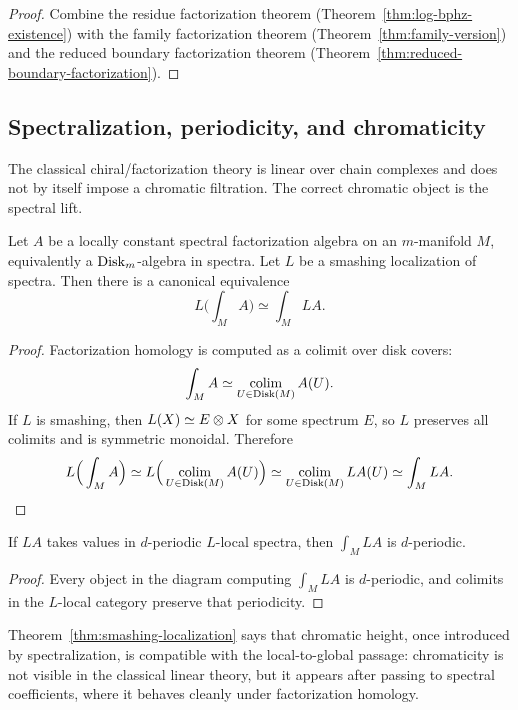 \begin{proof}
Combine the residue factorization theorem (Theorem~\ref{thm:log-bphz-existence}) with the family factorization theorem (Theorem~\ref{thm:family-version}) and the reduced boundary factorization theorem (Theorem~\ref{thm:reduced-boundary-factorization}).
\end{proof}

\subsection{Spectralization, periodicity, and chromaticity}
The classical chiral/factorization theory is linear over chain complexes and does not by itself impose a chromatic filtration. The correct chromatic object is the spectral lift.

\begin{theorem}%
Let $A$ be a locally constant spectral factorization algebra on an $m$-manifold $M$, equivalently a $\mathrm{Disk}_m$-algebra in spectra. Let $L$ be a smashing localization of spectra. Then there is a canonical equivalence
\[
 L\Big(\int_M A\Big) \simeq \int_M LA.
\]
\end{theorem}

\begin{proof}
Factorization homology is computed as a colimit over disk covers:
\[
 \int_M A \simeq \operatorname*{colim}_{U\in \mathrm{Disk}(M)} A(U).
\]
If $L$ is smashing, then $L(X)\simeq E\otimes X$ for some spectrum $E$, so $L$ preserves all colimits and is symmetric monoidal. Therefore
\[
 L\Big(\int_M A\Big)
 \simeq
 L\Big(\operatorname*{colim}_{U\in \mathrm{Disk}(M)}A(U)\Big)
 \simeq
 \operatorname*{colim}_{U\in \mathrm{Disk}(M)}LA(U)
 \simeq
 \int_M LA.
\]
\end{proof}

\begin{corollary}%
If $LA$ takes values in $d$-periodic $L$-local spectra, then $\int_M LA$ is $d$-periodic.
\end{corollary}

\begin{proof}
Every object in the diagram computing $\int_M LA$ is $d$-periodic, and colimits in the $L$-local category preserve that periodicity.
\end{proof}

\begin{remark}[Chromaticity]
Theorem~\ref{thm:smashing-localization} says that chromatic height, once introduced by spectralization, is compatible with the local-to-global passage: chromaticity is not visible in the classical linear theory, but it appears after passing to spectral coefficients, where it behaves cleanly under factorization homology.
\end{remark}

